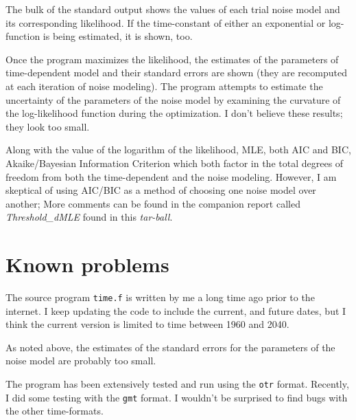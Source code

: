 \documentclass[12pt]{amsart}
\begin{document}
The bulk of the standard output shows the values of each trial noise model and its corresponding likelihood. If
the time-constant of either an exponential or log-function is being estimated, it is shown, too.

Once the program maximizes the likelihood, the estimates of the parameters of time-dependent model 
and their standard errors are shown (they are recomputed at each iteration of noise modeling). 
The program attempts to estimate the uncertainty of the parameters of the noise model by
examining the curvature of the log-likelihood function during the optimization.  I don't believe these
results; they look too small.

Along with the value of the logarithm of the likelihood, MLE, both AIC and BIC, Akaike/Bayesian Information Criterion
which both factor in the total degrees of freedom from both the time-dependent and the noise modeling.  However,
I am skeptical of using  AIC/BIC as a method of choosing one noise model over another; More comments
can be found in the companion report called \textit{Threshold\_dMLE} found in this \textit{tar-ball}.

\section{Known problems}

The source program \texttt{time.f} is written by me a long time ago prior to the internet. I keep
updating the code to include the current, and future dates, but I think the current version is
limited to time between 1960 and 2040.

As noted above, the estimates of the standard errors for the parameters of the noise model are
probably too small.

The program has been extensively tested and run using the \texttt{otr} format. Recently, I did some
testing with the \texttt{gmt} format. I wouldn't be
surprised to find bugs with the other time-formats.
\end{document}
